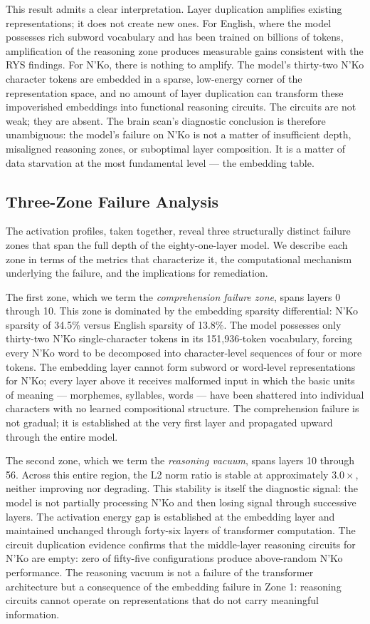 \documentclass[11pt]{article}
\newcommand{\nko}{N'Ko}
\begin{document}
This result admits a clear interpretation. Layer duplication amplifies existing representations; it does not create new ones. For English, where the model possesses rich subword vocabulary and has been trained on billions of tokens, amplification of the reasoning zone produces measurable gains consistent with the RYS findings. For \nko{}, there is nothing to amplify. The model's thirty-two \nko{} character tokens are embedded in a sparse, low-energy corner of the representation space, and no amount of layer duplication can transform these impoverished embeddings into functional reasoning circuits. The circuits are not weak; they are absent. The brain scan's diagnostic conclusion is therefore unambiguous: the model's failure on \nko{} is not a matter of insufficient depth, misaligned reasoning zones, or suboptimal layer composition. It is a matter of data starvation at the most fundamental level --- the embedding table.

\subsection{Three-Zone Failure Analysis}
\label{sec:three_zone}

The activation profiles, taken together, reveal three structurally distinct failure zones that span the full depth of the eighty-one-layer model. We describe each zone in terms of the metrics that characterize it, the computational mechanism underlying the failure, and the implications for remediation.

The first zone, which we term the \emph{comprehension failure zone}, spans layers 0 through 10. This zone is dominated by the embedding sparsity differential: \nko{} sparsity of 34.5\% versus English sparsity of 13.8\%. The model possesses only thirty-two \nko{} single-character tokens in its 151,936-token vocabulary, forcing every \nko{} word to be decomposed into character-level sequences of four or more tokens. The embedding layer cannot form subword or word-level representations for \nko{}; every layer above it receives malformed input in which the basic units of meaning --- morphemes, syllables, words --- have been shattered into individual characters with no learned compositional structure. The comprehension failure is not gradual; it is established at the very first layer and propagated upward through the entire model.

The second zone, which we term the \emph{reasoning vacuum}, spans layers 10 through 56. Across this entire region, the L2 norm ratio is stable at approximately $3.0\times$, neither improving nor degrading. This stability is itself the diagnostic signal: the model is not partially processing \nko{} and then losing signal through successive layers. The activation energy gap is established at the embedding layer and maintained unchanged through forty-six layers of transformer computation. The circuit duplication evidence confirms that the middle-layer reasoning circuits for \nko{} are empty: zero of fifty-five configurations produce above-random \nko{} performance. The reasoning vacuum is not a failure of the transformer architecture but a consequence of the embedding failure in Zone 1: reasoning circuits cannot operate on representations that do not carry meaningful information.
\end{document}
